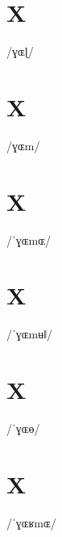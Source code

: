 \documentclass[10pt,a4paper,twoside]{book}
\begin{document}
\section*{X}

\begin{multicols}{3}
 {/ɣɶɭ/} {}
\end{multicols}

\section*{X}

\begin{multicols}{3}
 {/ɣɶm/} {}
\end{multicols}

\section*{X}

\begin{multicols}{3}
 {/ˈɣɶmɶ/} {}
\end{multicols}

\section*{X}

\begin{multicols}{3}
 {/ˈɣɶmʉǁ/} {}
\end{multicols}

\section*{X}

\begin{multicols}{3}
 {/ˈɣɶɵ/} {}
\end{multicols}

\section*{X}

\begin{multicols}{3}
 {/ˈɣɶʁmɶ/} {}
\end{multicols}
\end{document}

